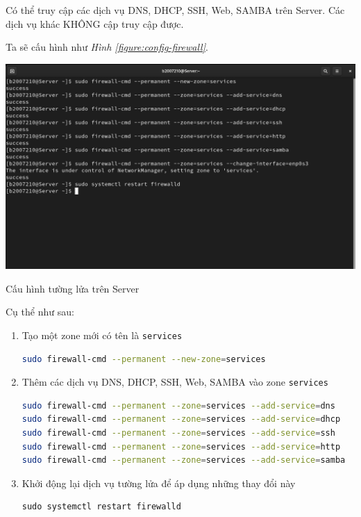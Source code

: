 \documentclass[a4paper, 11pt]{article}
\begin{document}
Có thể truy cập các dịch vụ DNS, DHCP, SSH, Web, SAMBA trên Server. Các dịch vụ khác KHÔNG cập truy cập được.

Ta sẽ cấu hình như \textit{Hình \ref{figure:config-firewall}}.

\begin{minipage}
    {\linewidth}
    \captionsetup{type=figure}
    \centering
    \includegraphics[width=\linewidth]{images/config-firewall.png}
    \caption{Cấu hình tường lửa trên Server}
    \label{figure:config-firewall}
\end{minipage}

Cụ thể như sau:
\begin{enumerate}
    \item Tạo một zone mới có tên là \texttt{services}
          \begin{lstlisting}[language=bash, caption=Tạo zone mới có tên là \texttt{services}]
sudo firewall-cmd --permanent --new-zone=services
\end{lstlisting}
    \item Thêm các dịch vụ DNS, DHCP, SSH, Web, SAMBA vào zone \texttt{services}
          \begin{lstlisting}[language=bash, caption={Thêm các dịch vụ DNS, DHCP, SSH, Web, SAMBA vào zone \texttt{services}}]
sudo firewall-cmd --permanent --zone=services --add-service=dns
sudo firewall-cmd --permanent --zone=services --add-service=dhcp
sudo firewall-cmd --permanent --zone=services --add-service=ssh
sudo firewall-cmd --permanent --zone=services --add-service=http
sudo firewall-cmd --permanent --zone=services --add-service=samba
\end{lstlisting}
    \item Khởi động lại dịch vụ tường lửa để áp dụng những thay đổi này
          \begin{lstlisting}
sudo systemctl restart firewalld
\end{lstlisting}
\end{enumerate}
\end{document}
